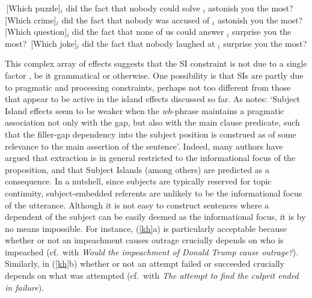 \documentclass[output=paper]{langsci/langscibook}
\begin{document}
\ea
\ea  \,[Which puzzle]$_i$ did the fact that nobody could solve \spc$_i$ astonish you the most?
\ex \,[Which crime]$_i$ did the fact that nobody was accused of \spc$_i$ astonish you the most?
\ex \,[Which question]$_i$ did the fact that none of us could answer \spc$_i$  surprise you the most?
\ex \,[Which joke]$_i$ did the fact that nobody laughed at \spc$_i$ surprise you the most?
\z \label{excz}
\z

This complex array of effects  suggests that the SI constraint is not due to a single factor
\citep{chomsky08,chavessubj,fernandez}, be it grammatical or otherwise.  One possibility is that SIs are partly due to pragmatic and processing constraints, perhaps not too different from those that appear to be active in the island effects discussed so far. As  \citet[495]{kluender06} notes: `Subject Island effects seem to be  weaker when the  \emph{wh}-phrase maintains a pragmatic  association not only with the gap, but also with the main clause predicate,  such that the filler-gap dependency into the subject position is construed as of some relevance to the main assertion of the sentence'. Indeed, many authors \citep{shir-jrn,valin86,kuno87,ken,Dean,goldberg13} have argued that
extraction is in general restricted to the informational focus of the proposition, and that
Subject Islands (among others) are predicted as a consequence. In a nutshell,
since subjects  are typically reserved for topic continuity,  subject-embedded referents are unlikely to be the informational focus of the utterance.  Although it is not easy to construct sentences where a dependent of the subject can be easily deemed as the informational focus, it is by no means impossible. 
For instance,  (\ref{kh}a) is particularly acceptable because whether or not an impeachment causes outrage crucially depends on who is impeached (cf.\ with  {\it Would the impeachment of Donald Trump cause outrage?}). Similarly, in (\ref{kh}b) whether or not an attempt failed or succeeded crucially depends on what was attempted (cf.\ with {\it The attempt to find the culprit ended in failure}). 
\end{document}
